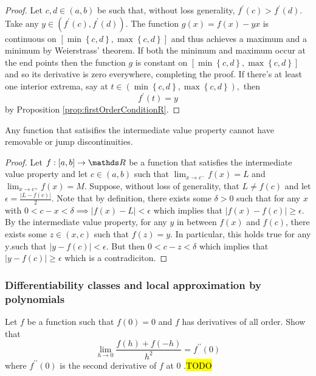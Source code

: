 \begin{proof}
Let $c,d\in\left(a,b\right)$ be such that, without loss generality,
$f^{\prime}\left(c\right)>f^{\prime}\left(d\right).$ Take any $y\in\left(f^{\prime}\left(c\right),f^{\prime}\left(d\right)\right)$.
The function $g\left(x\right)=f\left(x\right)-yx$ is continuous on
$\left[\min\left\{ c,d\right\} ,\max\left\{ c,d\right\} \right]$
and thus achieves a maximum and a minimum by Weierstrass' theorem.
If both the minimum and maximum occur at the end points then the function
$g$ is constant on $\left[\min\left\{ c,d\right\} ,\max\left\{ c,d\right\} \right]$
and so its derivative is zero everywhere, completing the proof. If
there's at least one interior extrema, say at $t\in\left(\min\left\{ c,d\right\} ,\max\left\{ c,d\right\} \right),$
then
\[
f^{\prime}\left(t\right)=y
\]
by Proposition \ref{prop:firstOrderConditionR}.
\end{proof}
\begin{lem}
\label{lem:IVTJump}Any function that satisifies the intermediate
value property cannot have removable or jump discontinuities.
\end{lem}

\begin{proof}
Let $f:\left[a,b\right]\to\R$ be a function that satisfies the intermediate
value property and let $c\in\left(a,b\right)$ such that $\lim_{x\to c^{-}}f\left(x\right)=L$
and $\lim_{x\to c^{+}}f\left(x\right)=M$. Suppose, without loss of
generality, that $L\neq f\left(c\right)$ and let $\epsilon=\frac{\lvert L-f\left(c\right)\rvert}{2}.$
Note that by definition, there exists some $\delta>0$ such that for
any $x$ with $0<c-x<\delta\implies\lvert f\left(x\right)-L\rvert<\epsilon$
which implies that $\lvert f\left(x\right)-f\left(c\right)\rvert\geq\epsilon.$
By the intermediate value property, for any $y$ in between $f\left(x\right)$
and $f\left(c\right)$, there exists some $z\in\left(x,c\right)$
such that $f\left(z\right)=y.$ In particular, this holds true for
any $\text{y}.$such that $\lvert y-f\left(c\right)\rvert<\epsilon.$
But then $0<c-z<\delta$ which implies that $\lvert y-f\left(c\right)\rvert\geq\epsilon$
which is a contradiciton.
\end{proof}

\subsubsection{Differentiability classes and local approximation by polynomials}
\begin{example}
\label{exa:isi2007samplepsb3}Let $f$ be a function such that $f(0)=0$
and $f$ has derivatives of all order. Show that 
\[
\lim_{h\rightarrow0}\frac{f(h)+f(-h)}{h^{2}}=f^{\prime\prime}(0)
\]
 where $f^{\prime\prime}(0)$ is the second derivative of $f$ at
0 .\hl{TODO}
\end{example}


